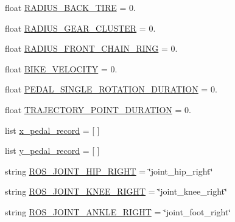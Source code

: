 \begin{DoxyCompactItemize}
\item 
float \mbox{\hyperlink{namespacepedal__simulation__interpolation__lennard_a7a14a8b1a741fe9dc6a44b47532e367a}{R\+A\+D\+I\+U\+S\+\_\+\+B\+A\+C\+K\+\_\+\+T\+I\+RE}} = 0.
\item 
float \mbox{\hyperlink{namespacepedal__simulation__interpolation__lennard_a31df4b32bc9250de987071c6646012b3}{R\+A\+D\+I\+U\+S\+\_\+\+G\+E\+A\+R\+\_\+\+C\+L\+U\+S\+T\+ER}} = 0.
\item 
float \mbox{\hyperlink{namespacepedal__simulation__interpolation__lennard_a73f512d5393e7ce24f56d7ae8fbee327}{R\+A\+D\+I\+U\+S\+\_\+\+F\+R\+O\+N\+T\+\_\+\+C\+H\+A\+I\+N\+\_\+\+R\+I\+NG}} = 0.
\item 
float \mbox{\hyperlink{namespacepedal__simulation__interpolation__lennard_a9a3debb8d42312cad2098653293a1947}{B\+I\+K\+E\+\_\+\+V\+E\+L\+O\+C\+I\+TY}} = 0.
\item 
float \mbox{\hyperlink{namespacepedal__simulation__interpolation__lennard_a031f9003542f23464a96a7a1b5c02c44}{P\+E\+D\+A\+L\+\_\+\+S\+I\+N\+G\+L\+E\+\_\+\+R\+O\+T\+A\+T\+I\+O\+N\+\_\+\+D\+U\+R\+A\+T\+I\+ON}} = 0.
\item 
float \mbox{\hyperlink{namespacepedal__simulation__interpolation__lennard_a8070b30a801a4d0b543ef09ed39b38d2}{T\+R\+A\+J\+E\+C\+T\+O\+R\+Y\+\_\+\+P\+O\+I\+N\+T\+\_\+\+D\+U\+R\+A\+T\+I\+ON}} = 0.
\item 
list \mbox{\hyperlink{namespacepedal__simulation__interpolation__lennard_a935ec90688f7591231c1c912505f3920}{x\+\_\+pedal\+\_\+record}} = \mbox{[} \mbox{]}
\item 
list \mbox{\hyperlink{namespacepedal__simulation__interpolation__lennard_a913a3917b0dbb27dd06be35dd53988df}{y\+\_\+pedal\+\_\+record}} = \mbox{[} \mbox{]}
\item 
string \mbox{\hyperlink{namespacepedal__simulation__interpolation__lennard_a74794ac4c06fcaf11b8a60fedb031366}{R\+O\+S\+\_\+\+J\+O\+I\+N\+T\+\_\+\+H\+I\+P\+\_\+\+R\+I\+G\+HT}} = \char`\"{}joint\+\_\+hip\+\_\+right\char`\"{}
\item 
string \mbox{\hyperlink{namespacepedal__simulation__interpolation__lennard_a712b495356e02e1515787228bb85c81f}{R\+O\+S\+\_\+\+J\+O\+I\+N\+T\+\_\+\+K\+N\+E\+E\+\_\+\+R\+I\+G\+HT}} = \char`\"{}joint\+\_\+knee\+\_\+right\char`\"{}
\item 
string \mbox{\hyperlink{namespacepedal__simulation__interpolation__lennard_a1682632b545036588f264608a2096746}{R\+O\+S\+\_\+\+J\+O\+I\+N\+T\+\_\+\+A\+N\+K\+L\+E\+\_\+\+R\+I\+G\+HT}} = \char`\"{}joint\+\_\+foot\+\_\+right\char`\"{}

\end{DoxyCompactItemize}
